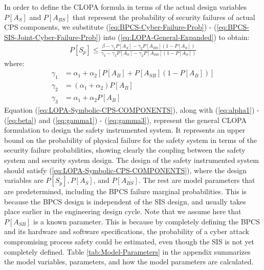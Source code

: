 \documentclass[journal]{IEEEtran}
\begin{document}
In order to define the CLOPA formula in terms of the actual design variables $P[A_S]$ and $P[A_{BS}]$ that represent the probability of security failures of actual CPS components, we substitute  (\ref{eq:BPCS-Cyber-Failure-Prob}) - (\ref{eq:BPCS-SIS-Joint-Cyber-Failure-Prob}) into (\ref{eq:LOPA-General-Expanded}) to obtain:
\begin{align}     
P[S_p] \leq \frac{\beta - \gamma_1 P[A_S] - \gamma_2 P[A_{BS}](1 - P[A_S])}{\gamma_3 - \gamma_3 P[A_S] - \gamma_2 P[A_{BS}] ( 1 - P[A_S])}
\label{eq:LOPA-Symbolic-CPS-COMPONENTS}
\end{align}
where:
\begin{align}
\gamma_1 &= \alpha_1 + \alpha_2 [P[A_B] + P[A_{SB}] (1 - P[A_B])] \label{eq:gamma1}\\
\gamma_2 &= (\alpha_1 + \alpha_2) P[A_B] \label{eq:gamma2}\\
\gamma_3 &= \alpha_1 + \alpha_2 P[A_B] \label{eq:gamma3}
\end{align}
Equation (\ref{eq:LOPA-Symbolic-CPS-COMPONENTS}), along with (\ref{eq:alpha1}) - (\ref{eq:beta}) and (\ref{eq:gamma1}) - (\ref{eq:gamma3}), represent the general CLOPA formulation to design the safety instrumented system. It represents an upper bound on the probability of physical failure for the safety system in terms of the security failure probabilities, showing clearly the coupling between the safety system and security system design. The design of the safety instrumented system should satisfy (\ref{eq:LOPA-Symbolic-CPS-COMPONENTS}), where the design variables are $P[S_p],P[A_S]$, and $P[A_{BS}]$. The rest are model parameters that are predetermined, including the BPCS failure marginal probabilities. This is because the BPCS design is independent of the SIS design, and usually takes place earlier in the engineering design cycle. Note that we assume here that $P[A_{SB}]$ is a known parameter. This is because by completely defining the BPCS and its hardware and software specifications, the probability of a cyber attack compromising process safety could be estimated, even though the SIS is not yet completely defined. Table \ref{tab:Model-Parameters} in the appendix summarizes the model variables, parameters, and how the model parameters are calculated.
\end{document}

